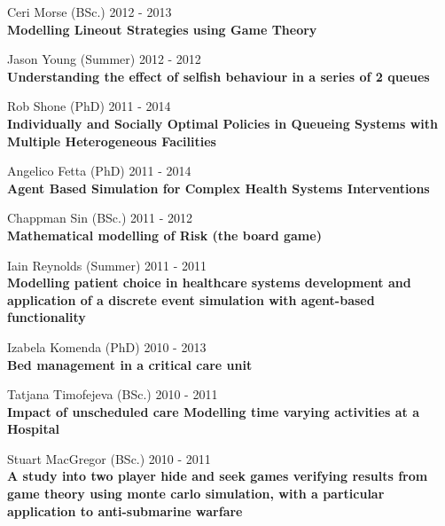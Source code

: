 \documentclass[10pt]{res} %
\begin{document}
\begin{resume}
\begin{etaremune}
\item
    Ceri Morse (BSc.) \hfill 2012 -
    2013\\
\textbf{Modelling Lineout Strategies using Game Theory}\\

\item
    Jason Young (Summer) \hfill 2012 -
    2012\\
\textbf{Understanding the effect of selfish behaviour in a series of 2 queues}\\

\item
    Rob Shone (PhD) \hfill 2011 -
    2014\\
\textbf{Individually and Socially Optimal Policies in Queueing Systems with Multiple Heterogeneous Facilities}\\

\item
    Angelico Fetta (PhD) \hfill 2011 -
    2014\\
\textbf{Agent Based Simulation for Complex Health Systems Interventions}\\

\item
    Chappman Sin (BSc.) \hfill 2011 -
    2012\\
\textbf{Mathematical modelling of Risk (the board game)}\\

\item
    Iain Reynolds (Summer) \hfill 2011 -
    2011\\
\textbf{Modelling patient choice in healthcare systems development and application of a discrete event simulation with agent-based functionality}\\

\item
    Izabela Komenda (PhD) \hfill 2010 -
    2013\\
\textbf{Bed management in a critical care unit}\\

\item
    Tatjana Timofejeva (BSc.) \hfill 2010 -
    2011\\
\textbf{Impact of unscheduled care Modelling time varying activities at a Hospital}\\

\item
    Stuart MacGregor (BSc.) \hfill 2010 -
    2011\\
\textbf{A study into two player hide and seek games verifying results from game theory using monte carlo simulation, with a particular application to anti-submarine warfare}\\


\end{etaremune}
\end{resume}
\end{document}
